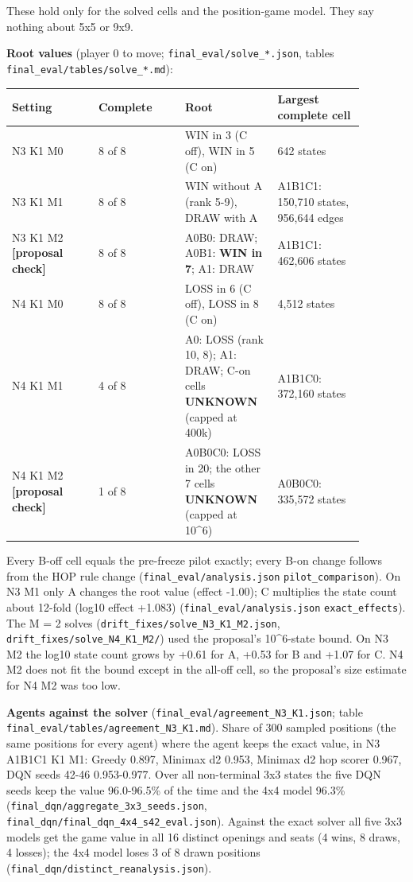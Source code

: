 \documentclass[11pt]{article}
\begin{document}
These hold only for the solved cells and the position-game model. They say nothing about 5x5 or 9x9.

\textbf{Root values} (player 0 to move; \texttt{final\_eval/solve\_*.json}, tables \texttt{final\_eval/tables/solve\_*.md}):

\begin{center}\scriptsize
\begin{longtable}{p{0.22\linewidth}p{0.22\linewidth}p{0.22\linewidth}p{0.22\linewidth}}
\toprule
Setting & Complete & Root & Largest complete cell \\
\midrule
N3 K1 M0 & 8 of 8 & WIN in 3 (C off), WIN in 5 (C on) & 642 states \\
N3 K1 M1 & 8 of 8 & WIN without A (rank 5-9), DRAW with A & A1B1C1: 150,710 states, 956,644 edges \\
N3 K1 M2 \textbf{[proposal check]} & 8 of 8 & A0B0: DRAW; A0B1: \textbf{WIN in 7}; A1: DRAW & A1B1C1: 462,606 states \\
N4 K1 M0 & 8 of 8 & LOSS in 6 (C off), LOSS in 8 (C on) & 4,512 states \\
N4 K1 M1 & 4 of 8 & A0: LOSS (rank 10, 8); A1: DRAW; C-on cells \textbf{UNKNOWN} (capped at 400k) & A1B1C0: 372,160 states \\
N4 K1 M2 \textbf{[proposal check]} & 1 of 8 & A0B0C0: LOSS in 20; the other 7 cells \textbf{UNKNOWN} (capped at 10\textasciicircum{}6) & A0B0C0: 335,572 states \\
\bottomrule
\end{longtable}
\end{center}

Every B-off cell equals the pre-freeze pilot exactly; every B-on change follows from the HOP
rule change (\texttt{final\_eval/analysis.json} \texttt{pilot\_comparison}). On N3 M1 only A changes the root
value (effect -1.00); C multiplies the state count about 12-fold (log10 effect +1.083)
(\texttt{final\_eval/analysis.json} \texttt{exact\_effects}). The M = 2 solves (\texttt{drift\_fixes/solve\_N3\_K1\_M2.json},
\texttt{drift\_fixes/solve\_N4\_K1\_M2/}) used the proposal's 10\textasciicircum{}6-state bound. On N3 M2 the log10 state
count grows by +0.61 for A, +0.53 for B and +1.07 for C. N4 M2 does not fit the bound except
in the all-off cell, so the proposal's size estimate for N4 M2 was too low.

\textbf{Agents against the solver} (\texttt{final\_eval/agreement\_N3\_K1.json}; table \texttt{final\_eval/tables/agreement\_N3\_K1.md}).
Share of 300 sampled positions (the same positions for every agent) where the agent keeps the
exact value, in N3 A1B1C1 K1 M1: Greedy 0.897, Minimax d2 0.953, Minimax d2 hop scorer 0.967,
DQN seeds 42-46 0.953-0.977. Over all non-terminal 3x3 states the five DQN seeds keep the value
96.0-96.5\% of the time and the 4x4 model 96.3\% (\texttt{final\_dqn/aggregate\_3x3\_seeds.json},
\texttt{final\_dqn/final\_dqn\_4x4\_s42\_eval.json}). Against the exact solver all five 3x3 models get the
game value in all 16 distinct openings and seats (4 wins, 8 draws, 4 losses); the 4x4 model loses
3 of 8 drawn positions (\texttt{final\_dqn/distinct\_reanalysis.json}).
\end{document}
